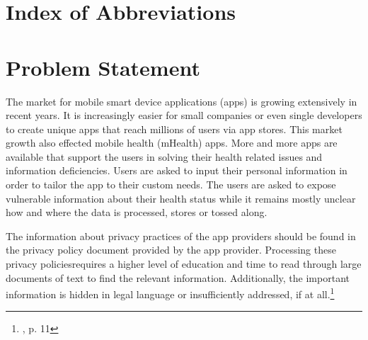 \documentclass[
	a4paper,
	oneside,
	12pt,
	liststotocnumbered
]{article}
\let\cite\textcite
\begin{document}
\renewcommand{\figurename}{Figure}
\renewcommand{\tablename}{Table}
\renewcommand\thefigure{\arabic{section}-\arabic{figure}}
\renewcommand\thetable{Tab. \arabic{section}-\arabic{table}}
\newcommand{\todo}[1]{\textbf{\textsc{\textcolor{red}{TODO: #1}}}}

\newcommand{\mH}{mHealth }
\newcommand{\ap}{app provider}
\newcommand{\pp}{privacy policy}
\newcommand{\pps}{privacy policies}
\newcommand{\sca}{static code analysis}
\newcommand{\Sca}{Static code analysis}




\tableofcontents
\newpage

\section*{Index of Abbreviations}
\begin{acronym}[TTTTTTTTTTTTTTTTTTTT]
\end{acronym}
\newpage

\normalsize
{}

\section{Problem Statement}
The market for mobile smart device applications (apps) is growing extensively in recent years. 
It is increasingly easier for small companies or even single developers to create unique apps that reach millions of users via app stores.
This market growth also effected mobile health (\acs{mHealth}) apps. 
More and more apps are available that support the users in solving their health related issues and information deficiencies. 
Users are asked to input their personal information in order to tailor the app to their custom needs. 
The users are asked to expose vulnerable information about their health status while it remains mostly unclear how and where the data is processed, stores or tossed along.

The information about privacy practices of the \ap s should be found in the privacy policy document provided by the \ap.
Processing these \pps requires a higher level of education and time to read through large documents of text to find the relevant information. 
Additionally, the important information is hidden in legal language or insufficiently addressed, if at all.\footnote{\cite{Dehling2014}, p. 11}
\end{document}
